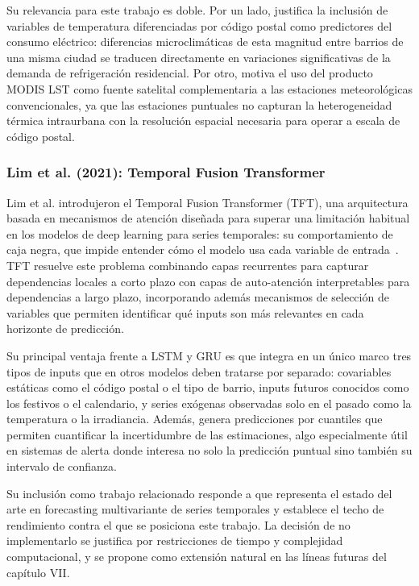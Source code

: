 \documentclass[12pt, a4paper]{article}
\begin{document}
Su relevancia para este trabajo es doble. Por un lado, justifica la inclusión de variables de temperatura diferenciadas por código postal como predictores del consumo eléctrico: diferencias microclimáticas de esta magnitud entre barrios de una misma ciudad se traducen directamente en variaciones significativas de la demanda de refrigeración residencial. Por otro, motiva el uso del producto MODIS LST como fuente satelital complementaria a las estaciones meteorológicas convencionales, ya que las estaciones puntuales no capturan la heterogeneidad térmica intraurbana con la resolución espacial necesaria para operar a escala de código postal.

\subsubsection{Lim et al. (2021): Temporal Fusion Transformer}


Lim et al. introdujeron el Temporal Fusion Transformer (TFT), una arquitectura basada en mecanismos de atención diseñada para superar una limitación habitual en los modelos de deep learning para series temporales: su comportamiento de caja negra, que impide entender cómo el modelo usa cada variable de entrada~\cite{lim2021}. TFT resuelve este problema combinando capas recurrentes para capturar dependencias locales a corto plazo con capas de auto-atención interpretables para dependencias a largo plazo, incorporando además mecanismos de selección de variables que permiten identificar qué inputs son más relevantes en cada horizonte de predicción.

Su principal ventaja frente a LSTM y GRU es que integra en un único marco tres tipos de inputs que en otros modelos deben tratarse por separado: covariables estáticas como el código postal o el tipo de barrio, inputs futuros conocidos como los festivos o el calendario, y series exógenas observadas solo en el pasado como la temperatura o la irradiancia. Además, genera predicciones por cuantiles que permiten cuantificar la incertidumbre de las estimaciones, algo especialmente útil en sistemas de alerta donde interesa no solo la predicción puntual sino también su intervalo de confianza.

Su inclusión como trabajo relacionado responde a que representa el estado del arte en forecasting multivariante de series temporales y establece el techo de rendimiento contra el que se posiciona este trabajo. La decisión de no implementarlo se justifica por restricciones de tiempo y complejidad computacional, y se propone como extensión natural en las líneas futuras del capítulo VII.
\end{document}
